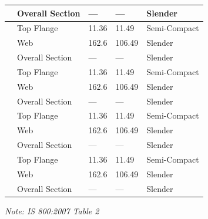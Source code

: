 \documentclass[12pt,a4paper]{report}
\numberwithin{table}{chapter}
\numberwithin{figure}{chapter}
\begin{document}
\begin{longtable}{|C{2.5cm}|L{3cm}|C{3.5cm}|C{2.5cm}|>{\centering\arraybackslash}p{4.0cm}|}
 & Overall Section & --- & --- & Slender \\[6pt]
\hline
{} & Top Flange & 11.36 & 11.49 & Semi-Compact \\[6pt]
 & Web & 162.6 & 106.49 & Slender \\[6pt]
 & Overall Section & --- & --- & Slender \\[6pt]
\hline
{} & Top Flange & 11.36 & 11.49 & Semi-Compact \\[6pt]
 & Web & 162.6 & 106.49 & Slender \\[6pt]
 & Overall Section & --- & --- & Slender \\[6pt]
\hline
{} & Top Flange & 11.36 & 11.49 & Semi-Compact \\[6pt]
 & Web & 162.6 & 106.49 & Slender \\[6pt]
 & Overall Section & --- & --- & Slender \\[6pt]
\hline
{} & Top Flange & 11.36 & 11.49 & Semi-Compact \\[6pt]
 & Web & 162.6 & 106.49 & Slender \\[6pt]
 & Overall Section & --- & --- & Slender \\[6pt]
\hline
\end{longtable}
\noindent\textit{Note: IS 800:2007 Table 2}
\end{document}
